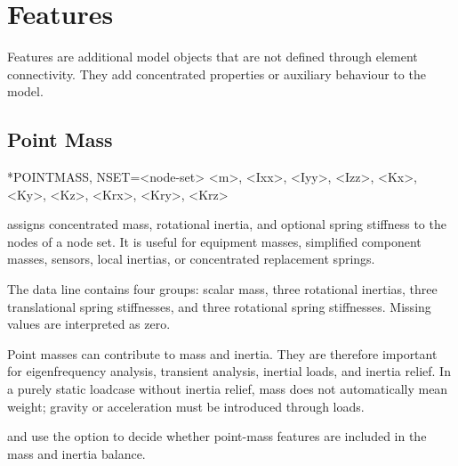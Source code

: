 \chapter{Features}

Features are additional model objects that are not defined through element connectivity. They add concentrated properties or auxiliary behaviour to the model.

\section{Point Mass}

\begin{syntax}
*POINTMASS, NSET=<node-set>
<m>, <Ixx>, <Iyy>, <Izz>, <Kx>, <Ky>, <Kz>, <Krx>, <Kry>, <Krz>
\end{syntax}

 assigns concentrated mass, rotational inertia, and optional spring stiffness to the nodes of a node set. It is useful for equipment masses, simplified component masses, sensors, local inertias, or concentrated replacement springs.

The data line contains four groups: scalar mass, three rotational inertias, three translational spring stiffnesses, and three rotational spring stiffnesses. Missing values are interpreted as zero.

Point masses can contribute to mass and inertia. They are therefore important for eigenfrequency analysis, transient analysis, inertial loads, and inertia relief. In a purely static loadcase without inertia relief, mass does not automatically mean weight; gravity or acceleration must be introduced through loads.

 and  use the option  to decide whether point-mass features are included in the mass and inertia balance.
